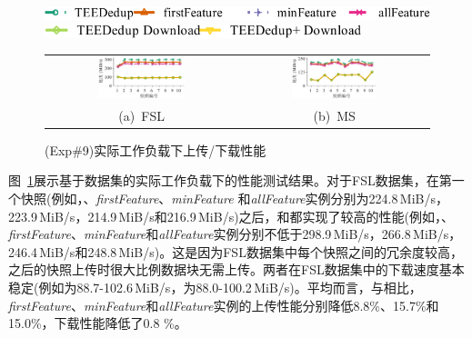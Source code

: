\begin{figure}[!htb]
    \centering
    \includegraphics[height=11pt]{pic/featurespy/plot/performance/LANTrace/trace_legend_upload.pdf}\\
    \includegraphics[height=11pt]{pic/featurespy/plot/performance/LANTrace/trace_legend_download.pdf}
    \vspace{5pt} \\
    \begin{tabular}{@{\ }c@{\ }c}
        \includegraphics[width=0.475\textwidth]{pic/featurespy/plot/performance/LANTrace/trace_fsl.pdf} &
        \includegraphics[width=0.475\textwidth]{pic/featurespy/plot/performance/LANTrace/trace_ms.pdf}    \\
        \mbox{\small (a) FSL}                                                                           &
        \mbox{\small (b)  MS}                                                                             \\
    \end{tabular}
    \caption{(Exp\#9)实际工作负载下上传/下载性能}
    \label{fig:featurespy-traceDrivenThroughput}
\end{figure}

图~\ref{fig:featurespy-traceDrivenThroughput}展示基于数据集的实际工作负载下\prototype 的性能测试结果。对于FSL数据集，在第一个快照(例如，\sysnameS、\textit{firstFeature}、\textit{minFeature} 和\textit{allFeature}实例分别为224.8\,MiB/s，223.9\,MiB/s，214.9\,MiB/s和216.9\,MiB/s)之后，\sysnameS 和\prototype 都实现了较高的性能(例如，\sysnameS、\textit{firstFeature}、\textit{minFeature}和\textit{allFeature}实例分别不低于298.9\,MiB/s，266.8\,MiB/s，246.4\,MiB/s和248.8\,MiB/s)。这是因为FSL数据集中每个快照之间的冗余度较高，之后的快照上传时很大比例数据块无需上传。两者在FSL数据集中的下载速度基本稳定(例如\sysnameS 为88.7-102.6\,MiB/s，\prototype 为88.0-100.2\,MiB/s)。平均而言，与\sysnameS 相比，\textit{firstFeature}、\textit{minFeature}和\textit{allFeature}实例的上传性能分别降低8.8\%、15.7\%和15.0\%，下载性能降低了0.8 \%。

